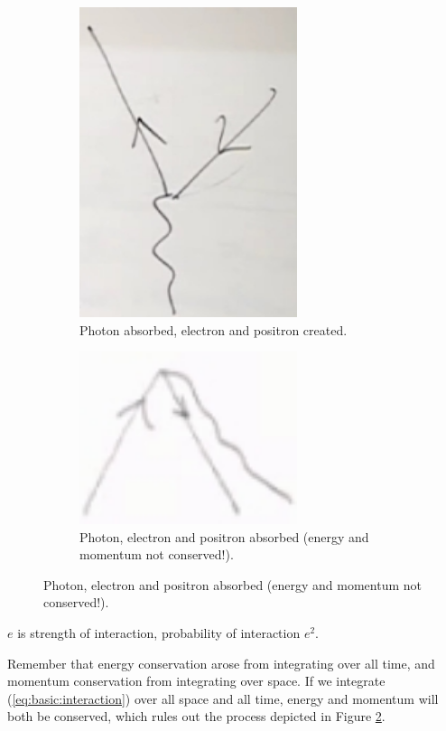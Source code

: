 \documentclass[]{article}
\begin{document}
\begin{figure}[H]
\begin{subfigure}{0.48\textwidth}
		\caption{Photon absorbed, electron and positron created.}
		\includegraphics[width=0.7\textwidth]{em-dirac4}
	\end{subfigure}
	\begin{subfigure}{0.48\textwidth}
		\caption{Photon, electron and positron absorbed (energy and momentum not conserved!).}\label{fig:em:dirac5}
		\includegraphics[width=0.7\textwidth]{em-dirac5}
	\end{subfigure}
\end{figure}

$e$ is strength of interaction, probability of interaction $e^2$.

Remember that energy conservation arose from integrating over all time, and momentum conservation from integrating over space. If we integrate (\ref{eq:basic:interaction}) over all space and all time,  energy and momentum will both be conserved, which rules out the process depicted in Figure \ref{fig:em:dirac5}.
\end{document}
